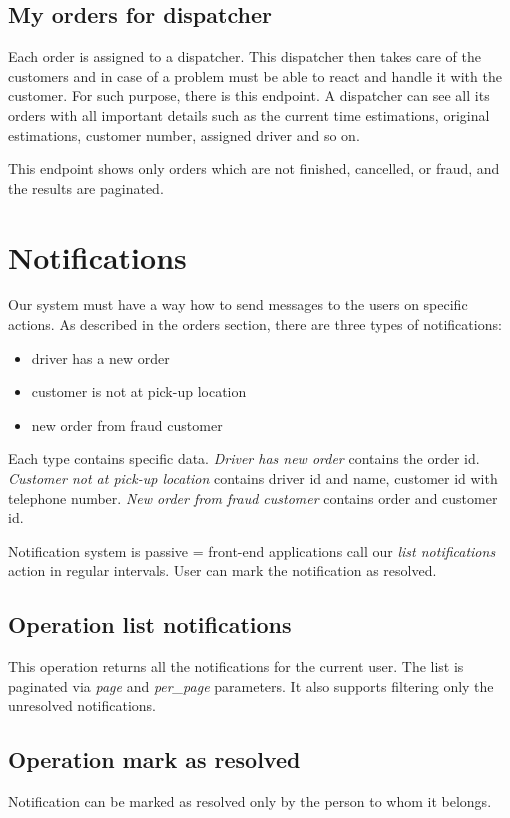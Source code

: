 		\subsection{My orders for dispatcher}
			Each order is assigned to a dispatcher. This dispatcher then takes care of the customers and in case of a problem must be able to react and handle it with the customer. For such purpose, there is this endpoint. A dispatcher can see all its orders with all important details such as the current time estimations, original estimations, customer number, assigned driver and so on.
			
			This endpoint shows only orders which are not finished, cancelled, or fraud, and the results are paginated.    
	
	\section{Notifications}
        Our system must have a way how to send messages to the users on specific actions. As described in the orders section, there are three types of notifications:
		\begin{itemize}
			\item driver has a new order
			\item customer is not at pick-up location
			\item new order from fraud customer
		\end{itemize}
		
		Each type contains specific data. \textit{Driver has new order} contains the order id. \textit{Customer not at pick-up location} contains driver id and name, customer id with telephone number. \textit{New order from fraud customer} contains order and customer id.
		
		
		Notification system is passive = front-end applications call our \textit{list notifications} action in regular intervals. User can mark the notification as resolved.
		
		
		\subsection{Operation list notifications}
			This operation returns all the notifications for the current user. The list is paginated via \textit{page} and \textit{per\_page} parameters. It also supports filtering only the unresolved notifications.
		\subsection{Operation mark as resolved}
			Notification can be marked as resolved only by the person to whom it belongs. 